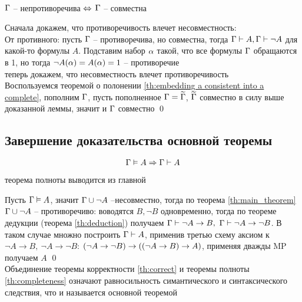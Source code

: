 \begin{theorem} \label{th:main_theorem}  \\
$\Gamma$ -- непротиворечива $\Leftrightarrow$ $\Gamma$ -- совместна
\end{theorem}
\beginproof Сначала докажем, что противоречивость влечет несовместность: \\
От противного: пусть $\Gamma$ -- противоречива, но совместна, тогда $\Gamma \vdash A, \Gamma \vdash \neg A$ для какой-то формулы $A$. Подставим набор $\alpha$ такой, что все формулы $\Gamma$ обращаются в 1, но тогда $\neg A(\alpha) =  A(\alpha) = 1$ -- противоречие\\
теперь докажем, что несовместность влечет противоречивость \\
Воспользуемся теоремой о полонении \ref{th:embedding a consistent into a complete}, пополним $\Gamma$, пусть пополненное $\Gamma = \widetilde{ \Gamma }$, $\widetilde{ \Gamma }$ совместно в силу выше доказанной леммы, значит и $\Gamma$ совместно \qed
\subsection{Завершение доказательства основной теоремы}
\begin{theorem}  \label{th:completeness} 
\begin{equation}
    \Gamma \vDash A \Rightarrow \Gamma \vdash A
\end{equation}
\end{theorem}
\begin{proposition} \label{pr:th_completeness_color_th_main}
теорема полноты выводится из главной
\end{proposition}
 Пусть $\Gamma \vDash A$, значит $\Gamma \cup \neg A$ --несовместно, тогда по теорема \ref{th:main_theorem} $\Gamma \cup \neg A$ -- противоречиво: воводятся $B, \neg B$ одновременно, тогда по теореме дедукции (теорема \ref{th:deduction}) получаем $\Gamma \vdash  \neg A \to B, ~ \Gamma \vdash \neg A \to \neg B$. В таком случае множно построить $\Gamma \vdash A$, применив третью схему аксиом  к $\neg A \to B, ~ \neg A \to \neg B$: $\left( \neg A \to \neg B \right) \to \left(  \left( \neg A \to B \right) \to A  \right)$, применяя дважды MP получаем $A$ \qed \\
Объединение теоремы корректности \ref{th:correct} и теоремы полноты \ref{th:completeness}  означают равносильность симантического и синтаксического следствия, что и называется основной теоремой \\
